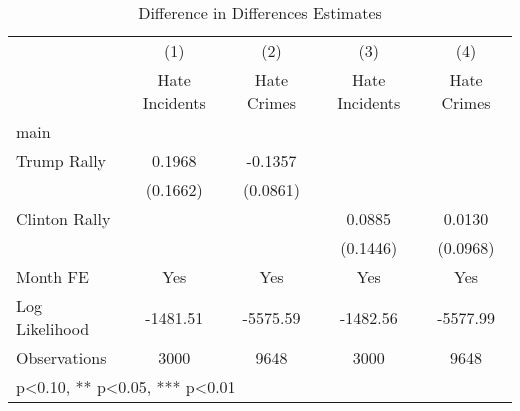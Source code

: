 \begin{table}[htbp]\centering
\def\sym#1{\ifmmode^{#1}\else\(^{#1}\)\fi}
\caption{Difference in Differences Estimates}
\begin{tabular}{l*{4}{c}}
\hline\hline
                    &\multicolumn{1}{c}{(1)}   &\multicolumn{1}{c}{(2)}   &\multicolumn{1}{c}{(3)}   &\multicolumn{1}{c}{(4)}   \\
                    &Hate Incidents   & Hate Crimes   &Hate Incidents   & Hate Crimes   \\
\hline
main                &               &               &               &               \\
Trump Rally         &      0.1968   &     -0.1357   &               &               \\
                    &    (0.1662)   &    (0.0861)   &               &               \\
Clinton Rally       &               &               &      0.0885   &      0.0130   \\
                    &               &               &    (0.1446)   &    (0.0968)   \\
Month FE            &         Yes   &         Yes   &         Yes   &         Yes   \\
\hline
Log Likelihood      &    -1481.51   &    -5575.59   &    -1482.56   &    -5577.99   \\
Observations        &        3000   &        9648   &        3000   &        9648   \\
\hline\hline
\multicolumn{5}{l}{\footnotesize * p<0.10, ** p<0.05, *** p<0.01}\\
\end{tabular}
\end{table}
